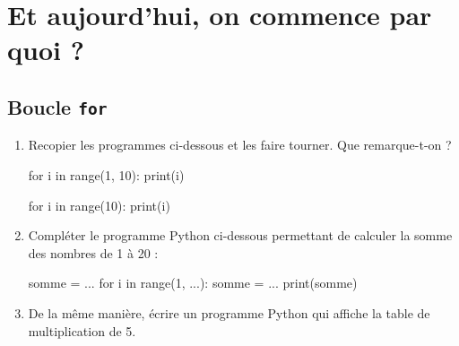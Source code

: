 \documentclass[12pt,a4paper, oneside]{article}
\theoremstyle{definition}
\begin{document}
\section{Et aujourd'hui, on commence par quoi ?} \label{sec:et-aujourd'hui-on-fait-quoi-?}
   \subsection{Boucle \texttt{for}}\label{subsec:boucle-texttt-for}
   \begin{enumerate}
      \item Recopier les programmes ci-dessous et les faire tourner.
      Que remarque-t-on ?

      \begin{minipage}{.4\textwidth}
        \begin{pyverbatim}
      for i in range(1, 10):
         print(i)
        \end{pyverbatim}
        \end{minipage}
      \begin{minipage}{.4\textwidth}
         \begin{pyverbatim}
      for i in range(10):
         print(i)
         \end{pyverbatim}
        \end{minipage}

      \newpage

      \item Compléter le programme Python ci-dessous permettant de calculer la somme des nombres de 1 à 20 :
         \begin{pyverbatim}
           somme = ...
           for i in range(1, ...):
             somme = ...
           print(somme)
        \end{pyverbatim}
      \item De la même manière, écrire un programme Python qui affiche la table de multiplication de 5.
   \end{enumerate}
\end{document}
